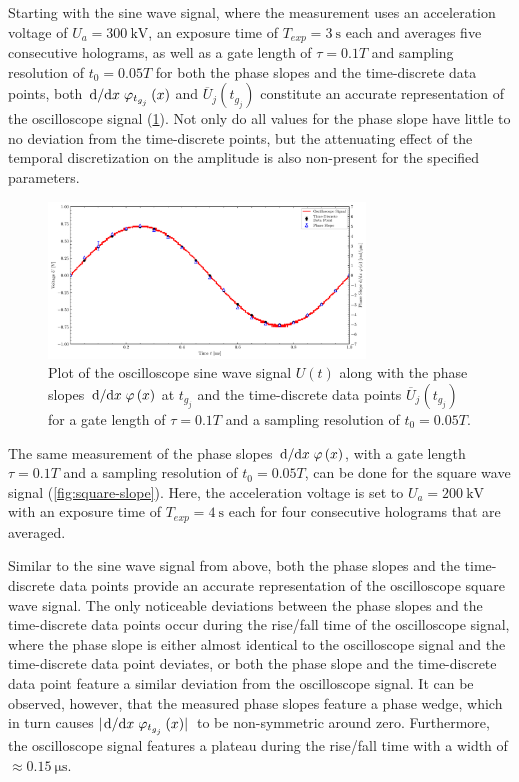 Starting with the sine wave signal, where the measurement uses an acceleration voltage of $U_a = \SI{300}{\kilo\volt}$, an exposure time of $T_{exp} = \SI{3}{\second}$ each and averages five consecutive holograms, as well as a gate length of $\tau = 0.1T$ and sampling resolution of $t_0 = 0.05T$ for both the phase slopes and the time-discrete data points, both $\dv*{}{x} {\varphi}_{t_{g_j}}\left(x\right)$ and $\overline{U}_j\left(t_{g_j}\right)$ constitute an accurate representation of the oscilloscope signal (\cref{fig:sine-slope}). Not only do all values for the phase slope have little to no deviation from the time-discrete points, but the attenuating effect of the temporal discretization on the amplitude is also non-present for the specified parameters.
\begin{figure}[H]
	\centering
	\includegraphics[width=0.75\textwidth]{Figures/Slope/sine_slope.pdf}
	\caption{Plot of the oscilloscope sine wave signal $U\left(t\right)$ along with the phase slopes $\dv*{}{x} \varphi\left(x\right)$ at $t_{g_j}$ and the time-discrete data points $\overline{U}_j\left(t_{g_j}\right)$ for a gate length of $\tau = 0.1T$ and a sampling resolution of $t_0 = 0.05T$.}
	\label{fig:sine-slope}
\end{figure}
The same measurement of the phase slopes $\dv*{}{x} \varphi\left(x\right)$, with a gate length $\tau = 0.1T$ and a sampling resolution of $t_0 = 0.05T$, can be done for the square wave signal (\cref{fig:square-slope}). Here, the acceleration voltage is set to $U_a = \SI{200}{\kilo\volt}$ with an exposure time of $T_{exp} = \SI{4}{\second}$ each for four consecutive holograms that are averaged.

Similar to the sine wave signal from above, both the phase slopes and the time-discrete data points provide an accurate representation of the oscilloscope square wave signal. The only noticeable deviations between the phase slopes and the time-discrete data points occur during the rise/fall time of the oscilloscope signal, where the phase slope is either almost identical to the oscilloscope signal and the time-discrete data point deviates, or both the phase slope and the time-discrete data point feature a similar deviation from the oscilloscope signal. It can be observed, however, that the measured phase slopes feature a phase wedge, which in turn causes $\abs*{\dv*{}{x} {\varphi}_{t_{g_j}}\left(x\right)}$ to be non-symmetric around zero. Furthermore, the oscilloscope signal features a plateau during the rise/fall time with a width of $\approx \SI{0.15}{\micro\second}$.

